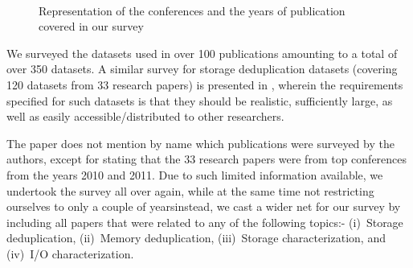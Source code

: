 
\begin{figure}
	\centering
	 \hfill
	\\
	\caption{Representation of the conferences and the years of publication covered in our survey}
	\label{fig:tag-clouds}
\end{figure}


We surveyed the datasets used in over
100 publications amounting to a total of over 350 datasets. A similar survey
for storage deduplication datasets (covering 120 datasets from 33 research 
papers) is presented in \cite{generating-datasets}, wherein the requirements
specified for such datasets is that they should be realistic, 
sufficiently large, as well as easily accessible/distributed to 
other researchers. 

The paper \cite{generating-datasets} does not
mention by name which publications were surveyed by the authors, except for 
stating that the 33 research papers were from top conferences from the
years 2010 and 2011. Due to such limited information available, we 
undertook the survey all over again, while at the same time not restricting
ourselves to only a couple of years\textemdash{}instead, we cast a wider net for our
survey by including all papers that were related to any of the following
topics:- (i)~Storage deduplication, 
(ii)~Memory deduplication, 
(iii)~Storage characterization, and 
(iv)~I/O characterization.


